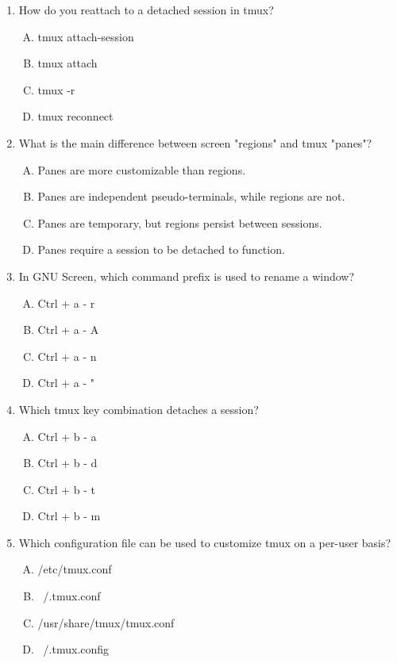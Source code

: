 \documentclass[a4paper]{report}
\begin{document}
\begin{enumerate}[1.]
    \item How do you reattach to a detached session in tmux?  
    \begin{enumerate}[A)]
        \item tmux attach-session  
        \item tmux attach  
        \item tmux -r  
        \item tmux reconnect  
    \end{enumerate}

    \item What is the main difference between screen "regions" and tmux "panes"?  
    \begin{enumerate}[A)]
        \item Panes are more customizable than regions.  
        \item Panes are independent pseudo-terminals, while regions are not.  
        \item Panes are temporary, but regions persist between sessions.  
        \item Panes require a session to be detached to function.  
    \end{enumerate}

    \item In GNU Screen, which command prefix is used to rename a window?  
    \begin{enumerate}[A)]
        \item Ctrl + a - r  
        \item Ctrl + a - A  
        \item Ctrl + a - n  
        \item Ctrl + a - "  
    \end{enumerate}

    \item Which tmux key combination detaches a session?  
    \begin{enumerate}[A)]
        \item Ctrl + b - a  
        \item Ctrl + b - d  
        \item Ctrl + b - t  
        \item Ctrl + b - m  
    \end{enumerate}

    \item Which configuration file can be used to customize tmux on a per-user basis?  
    \begin{enumerate}[A)]
        \item /etc/tmux.conf  
        \item ~/.tmux.conf  
        \item /usr/share/tmux/tmux.conf  
        \item ~/.tmux.config  
    \end{enumerate}

\end{enumerate}
\end{document}
